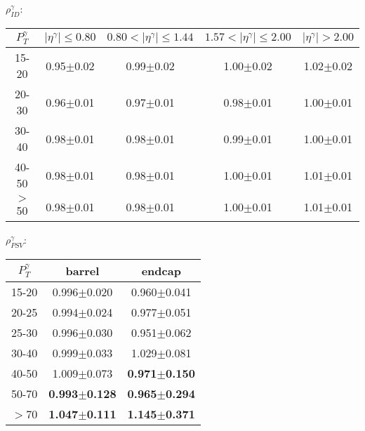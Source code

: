 \begin{frame}
{\begin{center}$\rho^{\gamma}_{ID}$: \end{center}}
\begin{table}[h]
  \tiny
  \begin{center}
   \begin{tabular}{|c|c|c|c|c|}
\hline
 $P_T^{\gamma}$  & $|\eta^{\gamma}|\leq 0.80$ & $0.80<|\eta^{\gamma}|\leq 1.44$ & $1.57<|\eta^{\gamma}|\leq 2.00$ & $|\eta^{\gamma}|> 2.00$\\ \hline
15-20          & 0.95$\pm$0.02   & 0.99$\pm$0.02        & 1.00$\pm$0.02        & 1.02$\pm$0.02 \\ \hline
20-30          & 0.96$\pm$0.01   & 0.97$\pm$0.01        & 0.98$\pm$0.01        & 1.00$\pm$0.01 \\ \hline
30-40          & 0.98$\pm$0.01   & 0.98$\pm$0.01        & 0.99$\pm$0.01        & 1.00$\pm$0.01 \\ \hline
40-50          & 0.98$\pm$0.01   & 0.98$\pm$0.01        & 1.00$\pm$0.01        & 1.01$\pm$0.01 \\ \hline
$>$50          & 0.98$\pm$0.01   & 0.98$\pm$0.01        & 1.00$\pm$0.01        & 1.01$\pm$0.01 \\ \hline
  \end{tabular}
  \label{tab:SFs_PhotonID}
  \end{center}
\end{table}

{\begin{center}$\rho^{\gamma}_{PSV}$: \end{center}}
\begin{table}[h]
  \tiny
  \begin{center}
   \begin{tabular}{|c|c|c|}
\hline
 $P_T^{\gamma}$  & barrel              & endcap \\ \hline
15-20          & 0.996$\pm$0.020     & 0.960$\pm$0.041 \\ \hline
20-25          & 0.994$\pm$0.024     & 0.977$\pm$0.051 \\ \hline
25-30          & 0.996$\pm$0.030     & 0.951$\pm$0.062 \\ \hline
30-40          & 0.999$\pm$0.033     & 1.029$\pm$0.081 \\ \hline
40-50          & 1.009$\pm$0.073     & {\bfseries{0.971$\pm$0.150}} \\ \hline
50-70          & {\bfseries{0.993$\pm$0.128}}     & {\bfseries{0.965$\pm$0.294}} \\ \hline
$>$70          & {\bfseries{1.047$\pm$0.111}}     & {\bfseries{1.145$\pm$0.371}} \\ \hline

  \end{tabular}
  \label{tab:SFs_PhotonPixelSeedVeto}
  \end{center}
\end{table}


\end{frame}%
